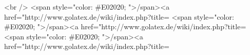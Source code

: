 <br />
<span style="color: #E02020; ">\</span><a href="http://www.golatex.de/wiki/index.php?title=%
<span style="color: #E02020; ">\</span><a href="http://www.golatex.de/wiki/index.php?title=%
<span style="color: #E02020; ">\</span><a href="http://www.golatex.de/wiki/index.php?title=%
